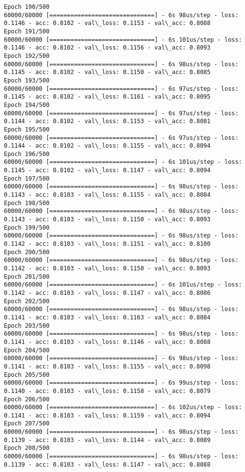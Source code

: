 \documentclass[11pt]{article}
\begin{document}
\begin{Verbatim}[commandchars=\\\{\}]
Epoch 190/500
60000/60000 [==============================] - 6s 98us/step - loss: 0.1146 - acc: 0.8102 - val\_loss: 0.1153 - val\_acc: 0.8088
Epoch 191/500
60000/60000 [==============================] - 6s 101us/step - loss: 0.1146 - acc: 0.8102 - val\_loss: 0.1156 - val\_acc: 0.8093
Epoch 192/500
60000/60000 [==============================] - 6s 98us/step - loss: 0.1145 - acc: 0.8102 - val\_loss: 0.1150 - val\_acc: 0.8085
Epoch 193/500
60000/60000 [==============================] - 6s 97us/step - loss: 0.1145 - acc: 0.8102 - val\_loss: 0.1161 - val\_acc: 0.8095
Epoch 194/500
60000/60000 [==============================] - 6s 97us/step - loss: 0.1144 - acc: 0.8102 - val\_loss: 0.1153 - val\_acc: 0.8081
Epoch 195/500
60000/60000 [==============================] - 6s 97us/step - loss: 0.1144 - acc: 0.8102 - val\_loss: 0.1155 - val\_acc: 0.8094
Epoch 196/500
60000/60000 [==============================] - 6s 101us/step - loss: 0.1145 - acc: 0.8102 - val\_loss: 0.1147 - val\_acc: 0.8094
Epoch 197/500
60000/60000 [==============================] - 6s 98us/step - loss: 0.1143 - acc: 0.8103 - val\_loss: 0.1155 - val\_acc: 0.8084
Epoch 198/500
60000/60000 [==============================] - 6s 98us/step - loss: 0.1143 - acc: 0.8103 - val\_loss: 0.1150 - val\_acc: 0.8093
Epoch 199/500
60000/60000 [==============================] - 6s 98us/step - loss: 0.1142 - acc: 0.8103 - val\_loss: 0.1151 - val\_acc: 0.8100
Epoch 200/500
60000/60000 [==============================] - 6s 98us/step - loss: 0.1142 - acc: 0.8103 - val\_loss: 0.1150 - val\_acc: 0.8093
Epoch 201/500
60000/60000 [==============================] - 6s 101us/step - loss: 0.1142 - acc: 0.8103 - val\_loss: 0.1147 - val\_acc: 0.8086
Epoch 202/500
60000/60000 [==============================] - 6s 98us/step - loss: 0.1141 - acc: 0.8103 - val\_loss: 0.1163 - val\_acc: 0.8084
Epoch 203/500
60000/60000 [==============================] - 6s 98us/step - loss: 0.1141 - acc: 0.8103 - val\_loss: 0.1146 - val\_acc: 0.8088
Epoch 204/500
60000/60000 [==============================] - 6s 98us/step - loss: 0.1141 - acc: 0.8103 - val\_loss: 0.1155 - val\_acc: 0.8098
Epoch 205/500
60000/60000 [==============================] - 6s 99us/step - loss: 0.1140 - acc: 0.8103 - val\_loss: 0.1158 - val\_acc: 0.8079
Epoch 206/500
60000/60000 [==============================] - 6s 102us/step - loss: 0.1141 - acc: 0.8103 - val\_loss: 0.1159 - val\_acc: 0.8094
Epoch 207/500
60000/60000 [==============================] - 6s 98us/step - loss: 0.1139 - acc: 0.8103 - val\_loss: 0.1144 - val\_acc: 0.8089
Epoch 208/500
60000/60000 [==============================] - 6s 98us/step - loss: 0.1139 - acc: 0.8103 - val\_loss: 0.1147 - val\_acc: 0.8088

\end{Verbatim}
\end{document}
